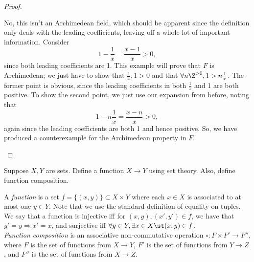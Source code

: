 \documentclass{assignment}
\begin{document}
\begin{proof}
\begin{qparts}
  \item No, this isn't an Archimedean field, which should be apparent since the definition only deals 
    with the leading coefficients, leaving off a whole lot of important information. Consider 
    $$ 1- \frac{1}{x} = \frac{x - 1}{x} > 0,$$ since both leading coefficients are 1. This example 
    will prove that $F$ is Archimedean; we just have to show that $\frac{1}{x}, 1 > 0$ and that 
    $\forall n\Z^{>0}, 1 > n\frac{1}{x}$. The former point is obvious, since the leading coefficients
    in both $\frac{1}{x}$ and 1 are both positive. To show the second point, we just use our expansion
    from before, noting that $$1 - n\frac{1}{x} = \frac{x - n}{x} > 0,$$ again since the leading coefficients
    are both 1 and hence positive. So, we have produced a counterexample for the Archimedean property
    in $F$.
  \end{qparts}
\end{proof}

\begin{question}[3]
  Suppose $X,Y$ are sets. Define a function $X \to Y$ using set theory. Also, define function composition.
\end{question}
A \emph{function} is a set $f = \{(x,y)\} \subset X\times Y$ where each $x\in X$ is associated to at
most one $y\in Y$. Note that we use the standard definition of equality on tuples. We say that a
function is injective iff for $(x, y), (x', y')\in f$, we have that $y' = y \Rightarrow x' = x$, and
surjective iff $\forall y\in Y, \exists x\in X \st (x,y)\in f$. \\

\emph{Function composition} is an associative non-commutative operation $\circ: F\times F' \to F''$,
where $F$ is the set of functions from $X\to Y$, $F'$ is the set of functions from $Y\to Z$, and
$F''$ is the set of functions from $X\to Z$. 
\end{document}
